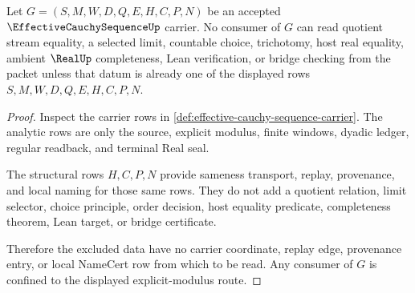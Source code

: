 \begin{theorem}\label{thm:effective-cauchy-sequence-nonescape}
Let $G=(S,M,W,D,Q,E,H,C,P,N)$ be an accepted $\EffectiveCauchySequenceUp$ carrier. No consumer of $G$ can read quotient stream equality, a selected limit, countable choice, trichotomy, host real equality, ambient $\RealUp$ completeness, Lean verification, or bridge checking from the packet unless that datum is already one of the displayed rows $S,M,W,D,Q,E,H,C,P,N$.
\end{theorem}
\begin{proof}
Inspect the carrier rows in \autoref{def:effective-cauchy-sequence-carrier}. The analytic rows are only the source, explicit modulus, finite windows, dyadic ledger, regular readback, and terminal Real seal.

The structural rows $H,C,P,N$ provide sameness transport, replay, provenance, and local naming for those same rows. They do not add a quotient relation, limit selector, choice principle, order decision, host equality predicate, completeness theorem, Lean target, or bridge certificate.

Therefore the excluded data have no carrier coordinate, replay edge, provenance entry, or local NameCert row from which to be read. Any consumer of $G$ is confined to the displayed explicit-modulus route.
\end{proof}



